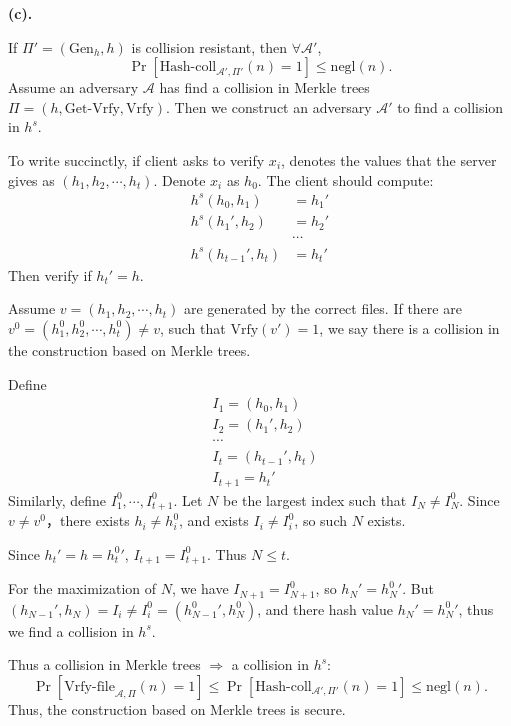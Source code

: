 \documentclass[a4paper]{article}
\newcommand{\negl}{\text{negl}}
\newcommand{\Gen}{\text{Gen}}
\newcommand{\Vrfy}{\text{Vrfy}}
\newcommand{\Getvrfy}{\text{Get-Vrfy}}
\newcommand{\hashcoll}{\text{Hash-coll}}
\newcommand{\vrfyfile}{\text{Vrfy-file}}
\newcommand{\A}{\mathcal{A}}
\newenvironment{problem}[2][Problem]{\begin{trivlist}
\item[\hskip \labelsep {\bfseries #1}\hskip \labelsep {\bfseries #2.}]}{\end{trivlist}}
\begin{document}
\begin{problem}{5.14}
\textbf{(c).}\par
If $\Pi'=(\Gen_h,h)$ is collision resistant, then $\forall \A'$, 
\[\Pr[\hashcoll_{\A',\Pi'}(n)=1]\le\negl(n).\]
Assume an adversary $\A$ has find a collision in Merkle trees $\Pi=(h,\Getvrfy,\Vrfy)$. Then we construct an adversary $\A'$ to find a collision in $h^s$.\par 
To write succinctly, if client asks to verify $x_i$, denotes the values that the server gives as $(h_1,h_2,\cdots,h_t)$. Denote $x_i$ as $h_0$.
The client should compute:
\begin{align*}
    h^s(h_0,h_1)&=h_1'\\
    h^s(h_1',h_2)&=h_2'\\
    &\cdots\\
    h^s(h_{t-1}',h_t)&=h_t'
\end{align*}
Then verify if $h_t'=h$.\par
Assume $v=(h_1,h_2,\cdots,h_t)$ are generated by the correct files. If there are $v^0=(h_1^0,h_2^0,\cdots,h_t^0)\ne v$, such that $\Vrfy(v')=1$, we say there is a collision in the construction based on Merkle trees.\par
Define 
\begin{align*}
    &I_1=(h_0,h_1)\\
    &I_2=(h_1',h_2)\\
    &\cdots\\
    &I_t=(h_{t-1}',h_t)\\
    &I_{t+1}=h_t'
\end{align*}
Similarly, define $I_1^0,\cdots,I_{t+1}^0$. Let $N$ be the largest index such that $I_N\ne I_N^0$. Since $v\ne v^0$，there exists $h_i\ne h_i^0$, and exists $I_i\ne I_i^0$, so such $N$ exists.\par
Since $h_t'=h={h_t^0}'$, $I_{t+1}=I_{t+1}^0$. Thus $N\le t$.\par
For the maximization of $N$, we have $I_{N+1}=I_{N+1}^0$, so $h_{N}'={h_N^0}'$. But $(h_{N-1}',h_N)=I_i\ne I_i^0=({h_{N-1}^0}',h_N^0)$, and there hash value $h_{N}'={h_N^0}'$, thus we find a collision in $h^s$. \par
Thus a collision in Merkle trees $\Rightarrow$ a collision in $h^s$:
\[\Pr[\vrfyfile_{\A,\Pi}(n)=1]\le\Pr[\hashcoll_{\A',\Pi'}(n)=1]\le\negl(n).\]
Thus, the construction based on Merkle trees is secure.
\end{problem}
\end{document}
